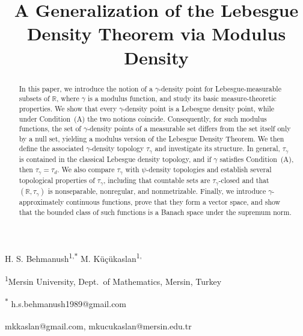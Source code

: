 \documentclass{amsart}
\title{A Generalization of the Lebesgue Density Theorem via Modulus Density}
\author{}
\date{}
\theoremstyle{plain}
\numberwithin{equation}{section}
\begin{document}
\vspace*{-3cm}
\maketitle


\begin{center}
{\large H. S. Behmanush\textsuperscript{1,$\ast$} \qquad
M. K\"u\c{c}\"ukaslan\textsuperscript{1,\dag }\par}

\vspace{0.5em}

\textsuperscript{1}Mersin University, Dept.\ of Mathematics, Mersin, Turkey\par

\vspace{0.3em}

\textsuperscript{$\ast$} h.s.behmanush1989@gmail.com \par
\textsuperscript{\dag}mkkaslan@gmail.com, \textsuperscript{\dag}mkucukaslan@mersin.edu.tr
\end{center}

\vspace{1em}
\maketitle

\begin{abstract}
In this paper, we introduce the notion of a $\gamma$-density point for Lebesgue-measurable subsets of $\mathbb{R}$, where $\gamma$ is a modulus function, and study its basic measure-theoretic properties. We show that every $\gamma$-density point is a Lebesgue density point, while under Condition~(A) the two notions coincide. Consequently, for such modulus functions, the set of $\gamma$-density points of a measurable set differs from the set itself only by a null set, yielding a modulus version of the Lebesgue Density Theorem. We then define the associated $\gamma$-density topology $\tau_\gamma$ and investigate its structure. In general, $\tau_\gamma$ is contained in the classical Lebesgue density topology, and if $\gamma$ satisfies Condition~(A), then $\tau_\gamma=\tau_d$. We also compare $\tau_\gamma$ with $\psi$-density topologies and establish several topological properties of $\tau_\gamma$, including that countable sets are $\tau_\gamma$-closed and that $(\mathbb{R},\tau_\gamma)$ is nonseparable, nonregular, and nonmetrizable. Finally, we introduce $\gamma$-approximately continuous functions, prove that they form a vector space, and show that the bounded class of such functions is a Banach space under the supremum norm. 
\end{abstract}
\end{document}
